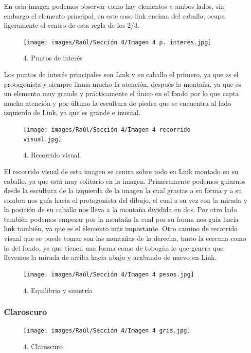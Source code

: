 \documentclass[12pt]{article}
\begin{document}
En esta imagen podemos observar como hay elementos a ambos lados, sin embargo el elemento principal, en este caso link encima del caballo, ocupa ligeramente el centro de esta regla de los 2/3.

\begin{figure}[H]
      \centering
      \texttt{[image: images/Raúl/Sección 4/Imagen 4 p. interes.jpg]}
      \caption{\small 4. Puntos de interés}
\end{figure}  

Los puntos de interés principales son Link y su caballo el primero, ya que es el protagonista y siempre llama mucho la atención, después la montaña, ya que es un elemento muy grande y prácticamente el único en el fondo por lo que capta mucha atención y por último la escultura de piedra que se encuentra al lado izquierdo de Link, ya que es grande e inusual.

\begin{figure}[H]
      \centering
      \texttt{[image: images/Raúl/Sección 4/Imagen 4 recorrido visual.jpg]}
      \caption{\small 4. Recorrido visual}
\end{figure}  

El recorrido visual de esta imagen se centra sobre todo en Link montado en su caballo, ya que está muy solitario en la imagen. Primeramente podemos guiarnos desde la escultura de la izquierda de la imagen la cual gracias a su forma y a su sombra nos guía hacia el protagonista del dibujo, el cual a su vez con la mirada y la posición de su caballo nos lleva a la montaña dividida en dos. Por otro lado también podemos empezar por la montaña la cual por su forma nos guía hacia link también, ya que es el elemento más importante. Otro camino de recorrido visual que se puede tomar son las montañas de la derecha, tanto la cercana como la del fondo, ya que tienen una forma como de tobogán lo que genera que llevemos la mirada de arriba hacia abajo y acabando de nuevo en Link.

\begin{figure}[H]
      \centering
      \texttt{[image: images/Raúl/Sección 4/Imagen 4 pesos.jpg]}
      \caption{\small 4. Equilibrio y simetría}
\end{figure} 

        \subsubsection{Claroscuro}

\begin{figure}[H]
      \centering
      \texttt{[image: images/Raúl/Sección 4/Imagen 4 gris.jpg]}
      \caption{\small 4. Claroscuro}
\end{figure} 
\end{document}
